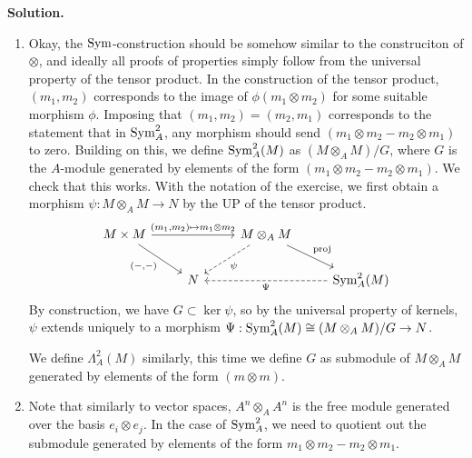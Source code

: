 \documentclass[a4paper,11pt]{article}
\begin{document}
\textbf{Solution.}
\begin{enumerate}
    \item
        Okay, the $\operatorname{Sym}$-construction should be somehow similar to the construciton
        of $\otimes$, and ideally all proofs of properties simply follow from
        the universal
        property of the tensor product. In the construction of the tensor product,
        $(m_1, m_2)$ corresponds to the image of $\phi(m_1 \otimes m_2)$ for 
        some suitable morphism $\phi$. Imposing that $(m_1, m_2) = (m_2, m_1)$ 
        corresponds to the statement that in $\operatorname{Sym}^2_A$, any morphism 
        should send $(m_1 \otimes m_2 - m_2 \otimes m_1)$ to zero. 
        Building on this, we define $\operatorname{Sym}^2_A(M)$ as $(M \otimes_A M)/ G$, where
        $G$ is the $A$-module generated by elements of the form $(m_1 \otimes m_2 -
        m_2 \otimes m_1)$. We check that this works. With the notation of the 
        exercise, we first obtain a morphism $\psi: M \otimes_A M \to N$ by
        the UP of the tensor product.
        \[\begin{tikzcd}[ampersand replacement=\&]
        	{M \times M} \&\& {M \otimes_A M} \\
        	\& N \&\& {\Sym_A^2(M)}
        	\arrow["{(-,-)}"', from=1-1, to=2-2]
        	\arrow["{(m_1, m_2) \mapsto m_1 \otimes m_2}", from=1-1, to=1-3]
        	\arrow["\psi", dashed, from=1-3, to=2-2]
        	\arrow["{\text{proj}}", from=1-3, to=2-4]
        	\arrow["\Psi", dashed, from=2-4, to=2-2]
        \end{tikzcd}\]
        By construction, we have $G \subset \ker \psi$, so by the universal property
        of kernels, $\psi$ extends uniquely to a morphism $\Psi: \operatorname{Sym}^2_A(M)
        \cong (M \otimes_A M) / G \to N$. 

        We define $\Lambda^2_A(M)$ similarly, this time we define $G$ as
        submodule of 
        $M \otimes_A M$ generated by elements of the form $(m \otimes m)$. 

    \item Note that similarly to vector spaces, $A^n \otimes_A A^n$ is the 
        free module generated over the basis $e_i \otimes e_j$. In the case of 
        $\operatorname{Sym}^2_A$, we need to quotient out the submodule generated by 
        elements of the form $m_1 \otimes m_2 - m_2 \otimes m_1$. 
\end{enumerate}


\contactend
\end{document}
